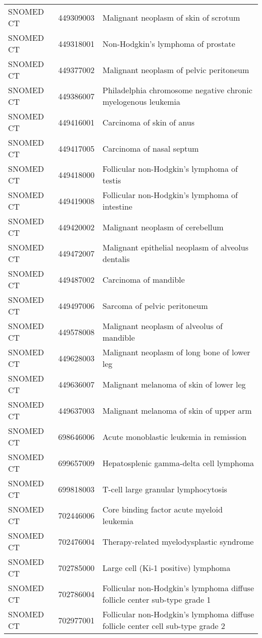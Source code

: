 \begin{longtable}{p{}p{}p{}}
  SNOMED CT & 449309003 & Malignant neoplasm of skin of scrotum \\ 
  SNOMED CT & 449318001 & Non-Hodgkin's lymphoma of prostate \\ 
  SNOMED CT & 449377002 & Malignant neoplasm of pelvic peritoneum \\ 
  SNOMED CT & 449386007 & Philadelphia chromosome negative chronic myelogenous leukemia \\ 
  SNOMED CT & 449416001 & Carcinoma of skin of anus \\ 
  SNOMED CT & 449417005 & Carcinoma of nasal septum \\ 
  SNOMED CT & 449418000 & Follicular non-Hodgkin's lymphoma of testis \\ 
  SNOMED CT & 449419008 & Follicular non-Hodgkin's lymphoma of intestine \\ 
  SNOMED CT & 449420002 & Malignant neoplasm of cerebellum \\ 
  SNOMED CT & 449472007 & Malignant epithelial neoplasm of alveolus dentalis \\ 
  SNOMED CT & 449487002 & Carcinoma of mandible \\ 
  SNOMED CT & 449497006 & Sarcoma of pelvic peritoneum \\ 
  SNOMED CT & 449578008 & Malignant neoplasm of alveolus of mandible \\ 
  SNOMED CT & 449628003 & Malignant neoplasm of long bone of lower leg \\ 
  SNOMED CT & 449636007 & Malignant melanoma of skin of lower leg \\ 
  SNOMED CT & 449637003 & Malignant melanoma of skin of upper arm \\ 
  SNOMED CT & 698646006 & Acute monoblastic leukemia in remission \\ 
  SNOMED CT & 699657009 & Hepatosplenic gamma-delta cell lymphoma \\ 
  SNOMED CT & 699818003 & T-cell large granular lymphocytosis \\ 
  SNOMED CT & 702446006 & Core binding factor acute myeloid leukemia \\ 
  SNOMED CT & 702476004 & Therapy-related myelodysplastic syndrome \\ 
  SNOMED CT & 702785000 & Large cell (Ki-1 positive) lymphoma \\ 
  SNOMED CT & 702786004 & Follicular non-Hodgkin's lymphoma diffuse follicle center sub-type grade 1 \\ 
  SNOMED CT & 702977001 & Follicular non-Hodgkin's lymphoma diffuse follicle center cell sub-type grade 2 \\ 

\end{longtable}

